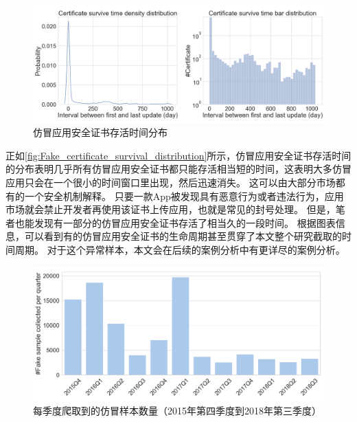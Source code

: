 \begin{figure}[htbp]
	\centering
	\includegraphics[width=\textwidth]{./Figures/edwin-Fake_certificate_survival_distribution2.png}
	\caption{仿冒应用安全证书存活时间分布}
	\label{fig:Fake_certificate_survival_distribution}
\end{figure}

正如\autoref{fig:Fake_certificate_survival_distribution}所示，仿冒应用安全证书存活时间的分布表明几乎所有仿冒应用安全证书都只能存活相当短的时间，这表明大多仿冒应用只会在一个很小的时间窗口里出现，然后迅速消失。
这可以由大部分市场都有的一个安全机制解释。
只要一款App被发现具有恶意行为或者违法行为，应用市场就会禁止开发者再使用该证书上传应用，也就是常见的封号处理。
但是，笔者也能发现有一部分的仿冒应用安全证书存活了相当久的一段时间。
根据图表信息，可以看到有的仿冒应用安全证书的生命周期甚至贯穿了本文整个研究截取的时间周期。
对于这个异常样本，本文会在后续的案例分析中有更详尽的案例分析。

\begin{figure}[htbp]
	\centering
	\includegraphics[width=\textwidth]{./Figures/edwin-Number_of_samples_collected_per_quarter_3.png}
	\caption{每季度爬取到的仿冒样本数量（2015年第四季度到2018年第三季度）}
	\label{fig:Number_per_quarter}
\end{figure}

